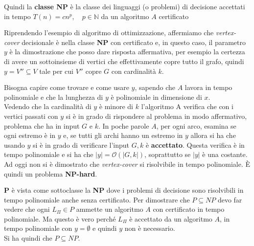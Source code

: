 Quindi la \textbf{classe NP} è la classe dei linguaggi (o problemi) di decisione accettati in tempo $T(n)=cn^p, \quad p\in\mathbb{N}$ da un algoritmo $A$ certificato

Riprendendo l'esempio di algoritmo di ottimizzazione, affermiamo che \emph{vertex-cover} decisionale è nella classe \textbf{NP} con certificato e, in questo caso, il parametro $y$ è la dimostrazione che posso dare risposta affermativa, per esempio la certezza di avere un sottoinsieme di vertici che effettivamente copre tutto il grafo, quindi $y=V''\subseteq V$ tale per cui $V''$ copre $G$ con cardinalità $k$. 


Bisogna capire come trovare e come usare $y$, sapendo che $A$ lavora in tempo polinomiale e che la lunghezza di $y$ è polinomiale in dimensione di $x$.\\ Vedendo che la cardinalità di $y$ è minore di $k$ l'algoritmo A verifica che con i vertici passati con $y$ si è in grado di rispondere al problema in modo affermativo, problema che ha in input $G$ e $k$. In poche parole $A$, per ogni arco, esamina se ogni estremo è in $y$ e, se tutti gli archi hanno un estremo in $y$ allora si ha che usando $y$ si è in grado di verificare l'input $G, k$ è \textbf{accettato}. Questa verifica è in tempo polinomiale e si ha che $|y|=\mathcal{O}(|G,k|)$, soprattutto se $|y|$ è una costante.\\ 
Ad oggi non si è dimostrato che \emph{vertex-cover} si risolvibile in tempo polinomiale. È quindi un problema \textbf{NP-hard}.\\ \newline

\textbf{P} è vista come sottoclasse la \textbf{NP} dove i problemi di decisione sono risolvibili in tempo polinomiale anche senza certificato. Per dimostrare che $P\subseteq NP$ devo far vedere che ogni $L_\Pi\in P$ ammette un algoritmo $A$ con certificato in tempo polinomiale. Ma questo è vero perché $L_\Pi$ è accettato da un algoritmo $A$, in tempo polinomiale con $y=\emptyset$ e quindi $y$ non è necessario.\\
Si ha quindi che $P\subseteq NP$. 